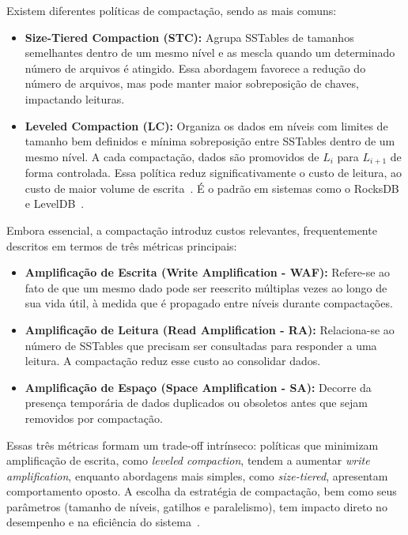 Existem diferentes políticas de compactação, sendo as mais comuns:

\begin{itemize}
    \item \textbf{Size-Tiered Compaction (STC):} Agrupa SSTables de tamanhos
    semelhantes dentro de um mesmo nível e as mescla quando um determinado número
    de arquivos é atingido. Essa abordagem favorece a redução do número de
    arquivos, mas pode manter maior sobreposição de chaves, impactando leituras.

    \item \textbf{Leveled Compaction (LC):} Organiza os dados em níveis com
    limites de tamanho bem definidos e mínima sobreposição entre SSTables dentro
    de um mesmo nível. A cada compactação, dados são promovidos de $L_i$ para
    $L_{i+1}$ de forma controlada. Essa política reduz significativamente o custo
    de leitura, ao custo de maior volume de escrita~\cite{rocksdb,lsm_survey}. É o padrão em sistemas como o RocksDB~\cite{rocksdb} e LevelDB~\cite{leveldb}.
\end{itemize}

Embora essencial, a compactação introduz custos relevantes, frequentemente
descritos em termos de três métricas principais:

\begin{itemize}
    \item \textbf{Amplificação de Escrita (Write Amplification - WAF):} Refere-se ao fato de que um mesmo dado pode ser reescrito múltiplas vezes ao longo de sua vida útil, à medida que é
    propagado entre níveis durante compactações.

    \item \textbf{Amplificação de Leitura (Read Amplification - RA):} Relaciona-se ao número de SSTables que precisam ser consultadas para responder a uma leitura. A compactação reduz
    esse custo ao consolidar dados.

    \item \textbf{Amplificação de Espaço (Space Ampliﬁcation - SA):} Decorre da presença temporária de dados duplicados ou obsoletos antes que sejam removidos por compactação.
\end{itemize}

Essas três métricas formam um trade-off intrínseco: políticas que minimizam amplificação de escrita, como \textit{leveled compaction}, tendem a aumentar
\textit{write amplification}, enquanto abordagens mais simples, como
\textit{size-tiered}, apresentam comportamento oposto. A escolha da estratégia de
compactação, bem como seus parâmetros (tamanho de níveis, gatilhos e paralelismo),
tem impacto direto no desempenho e na eficiência do sistema~\cite{Sarkar_2021}.

